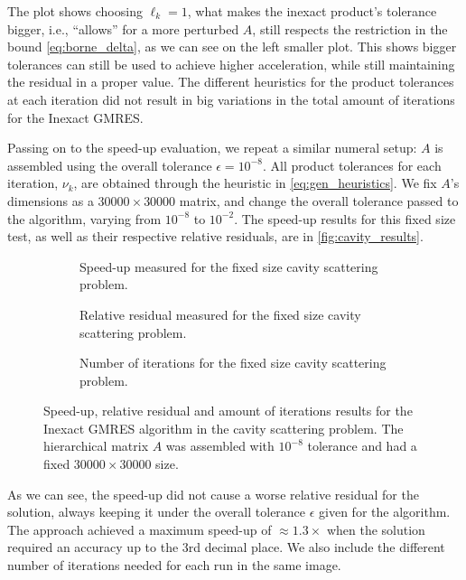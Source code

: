 The plot shows choosing $\ell_{k} = 1$, what makes the inexact product's tolerance bigger, i.e., “allows” for a more perturbed $A$, still respects the restriction in the bound \ref{eq:borne_delta}, as we can see on the left smaller plot. This shows bigger tolerances can still be used to achieve higher acceleration, while still maintaining the residual in a proper value. The different heuristics for the product tolerances at each iteration did not result in big variations in the total amount of iterations for the Inexact GMRES.

Passing on to the speed-up evaluation, we repeat a similar numeral setup: $A$ is assembled using the overall tolerance $\epsilon = 10^{-8}$. All product tolerances for each iteration, $\nu_{k}$, are obtained through the heuristic in \ref{eq:gen_heuristics}. We fix $A$'s dimensions as a $30000\times 30000$ matrix, and change the overall tolerance passed to the algorithm, varying from $10^{-8}$ to $10^{-2}$. The speed-up results for this fixed size test, as well as their respective relative residuals, are in \autoref{fig:cavity_results}.

\begin{figure}[h!]
    \centering
    \begin{subfigure}[b]{0.6\linewidth}
        
        \caption{Speed-up measured for the fixed size cavity scattering problem.}
    \end{subfigure}
    \begin{subfigure}[b]{0.4\linewidth}
        
        \caption{Relative residual measured for the fixed size cavity scattering problem.}
    \end{subfigure}
    \begin{subfigure}[b]{0.4\linewidth}
        
        \caption{Number of iterations for the fixed size cavity scattering problem.}
    \end{subfigure}
    \caption{Speed-up, relative residual and amount of iterations results for the Inexact GMRES algorithm in the cavity scattering problem. The hierarchical matrix $A$ was assembled with $10^{-8}$ tolerance and had a fixed $30000 \times 30000$ size.}
    \label{fig:cavity_results}
\end{figure}

As we can see, the speed-up did not cause a worse relative residual for the solution, always keeping it under the overall tolerance $\epsilon$ given for the algorithm. The approach achieved a maximum speed-up of $\approx 1.3\times$ when the solution required an accuracy up to the 3rd decimal place. We also include the different number of iterations needed for each run in the same image.

